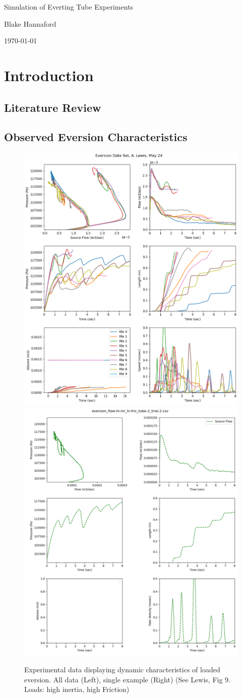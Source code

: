 \documentclass[letterpaper]{article}
\begin{document}
\begin{centering}
{\Large   Simulation of Everting Tube Experiments}

Blake Hannaford

\today

\end{centering}

\section{Introduction}

\subsection{Literature Review}

\subsection{Observed Eversion Characteristics}

\begin{figure}[h]\centering
\includegraphics[width=.475\textwidth]{ExpDataExampleAll.png}
\includegraphics[width=.475\textwidth]{ExpDataExample.png}
\caption{Experimental data displaying dynamic characteristics of loaded eversion.  All data (Left), single example (Right) (See Lewis, Fig 9. Loads: high inertia, high Friction)}
\label{Fig:experData}
\end{figure}
\end{document}
